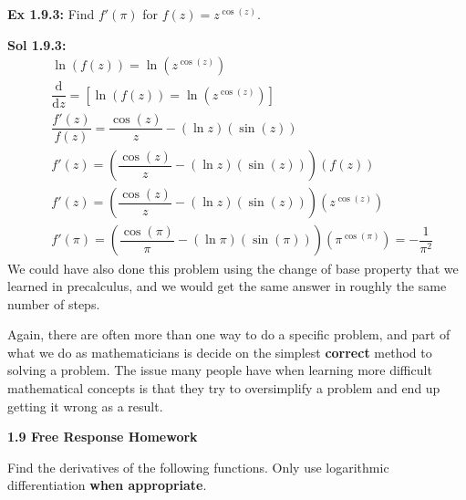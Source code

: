 \begin{tcolorbox}[example]
    \textbf{Ex 1.9.3: } Find $f'(\pi)$ for $f(z) = z^{\cos (z)}$.
\end{tcolorbox}
\begin{tcolorbox}[solution]
    \textbf{Sol 1.9.3: } \begin{align*}
        &\ln (f(z)) = \ln \left(z^{\cos (z)}\right) \\[11pt]
        & \dfrac{\mathrm{d}}{\mathrm{d}z} = \left[\ln (f(z)) = \ln \left(z^{\cos (z)}\right)\right] \\[11pt]
        & \dfrac{f'(z)}{f(z)} = \dfrac{\cos (z)}{z} - (\ln z)(\sin (z)) \\[11pt]
        & f'(z) = \left(\dfrac{\cos (z)}{z} - (\ln z)(\sin (z))\right)\left(f(z)\right) \\[11pt]
        & f'(z) = \left(\dfrac{\cos (z)}{z} - (\ln z)(\sin (z))\right)\left(z^{\cos (z)}\right) \\[11pt]
        & f'(\pi) = \left(\dfrac{\cos (\pi)}{\pi} - (\ln \pi)(\sin (\pi))\right)\left(\pi^{\cos (\pi)}\right) = \boxed{-\dfrac{1}{\pi^2}}
    \end{align*}
    We could have also done this problem using the change of base property that we learned in precalculus, and we would get the same answer in roughly the same number of steps.
\end{tcolorbox}

Again, there are often more than one way to do a specific problem, and part of what we do as mathematicians is decide on the simplest \textbf{correct} method to solving a problem. The issue many people have when learning more difficult mathematical concepts is that they try to oversimplify a problem and end up getting it wrong as a result. \par

\textbf{\large{1.9 Free Response Homework}} \par

Find the derivatives of the following functions. Only use logarithmic differentiation \textbf{when appropriate}. \par

 \\[11pt]
 \\[11pt]
 \\[11pt]

